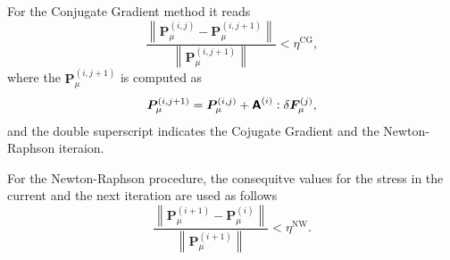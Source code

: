 For the Conjugate Gradient method it reads
\begin{equation}
\frac{\displaystyle{\left\|\bm P_\mu^{(i,j)}-\bm P_\mu^{(i,j+1)}\right\|}}{\displaystyle{\left\|\bm P_\mu^{(i,j+1)}\right\|}}<\eta^{\mathrm{CG}},
\end{equation}
where the \(\bm P_\mu^{(i,j+1)}\) is computed as
\begin{equation}
  \bm P_\mu^{(i,j+1)} = \bm P_\mu^{(i,j)}+ \boldsymbol{\mathsf{A}}^{(i)}: \delta \bm F_\mu^{(j)},
\end{equation}
and the double superscript indicates the Cojugate Gradient and the Newton-Raphson iteraion.

For the Newton-Raphson procedure, the consequitve values for the stress in the current and the next iteration are used as follows
\begin{equation}
\frac{\displaystyle{\left\|\bm P_\mu^{(i+1)}-\bm P_\mu^{(i)}\right\|}}{\displaystyle{\left\|\bm P_\mu^{(i+1)}\right\|}}<\eta^{\mathrm{NW}}.
\end{equation}
